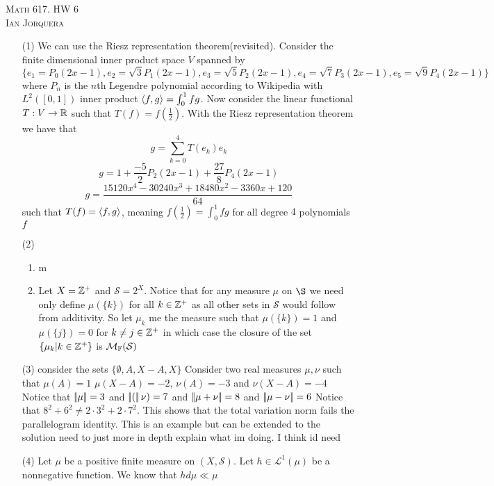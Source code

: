 \documentclass[12pt]{amsart}
\begin{document}
\begin{center}
   \textsc{Math 617. HW 6\\ Ian Jorquera}
\end{center}
\vspace{1em}

\begin{itemize}
    \item[(1)] We can use the Riesz representation theorem(revisited). 
    Consider the finite dimensional inner product space $V$ spanned by 
    \[\{e_1=P_0(2x-1),e_2=\sqrt{3}P_1(2x-1),e_3=\sqrt{5}P_2(2x-1),e_4=\sqrt{7}P_3(2x-1),e_5=\sqrt{9}P_4(2x-1)\}\] where $P_n$ is the $n$th 
    Legendre polynomial according to Wikipedia with $L^2([0,1])$ inner product $\left\langle f,g \right\rangle=\int_0^1fg$.
    Now consider the linear functional $T:V\rightarrow\mathbb{R}$ such that $T(f)=f(\frac{1}{2})$.
    With the Riesz representation theorem we have that 
    \[g=\sum_{k=0}^4T(e_k)e_k\]
    \[g=1+\frac{-5}{2}P_2(2x-1)+\frac{27}{8}P_4(2x-1)\]
    \[g=\frac{15120x^4-30240x^3+18480x^2-3360x+120}{64}\]
    such that $T(f)=\left\langle f,g \right\rangle$, meaning $f(\frac{1}{2})=\int_0^1fg$ for all degree $4$ polynomials $f$
    \item[(2)] 
    \begin{enumerate}[label=(\alph*)]
        \item m
        \item Let $X=\mathbb{Z}^+$ and $\mathcal{S}=2^X$. Notice that for any measure $\mu$
        on $\S$ we need only define $\mu(\{k\})$ for all $k\in \mathbb{Z}^+$ as 
        all other sets in $\mathcal S$ would follow from additivity.
        So let $\mu_k$ me the measure such that $\mu(\{k\})=1$ and 
        $\mu(\{j\})=0$ for $k\neq j\in\mathbb{Z}^+$ in which case the closure of the 
        set $\{\mu_k | k\in\mathbb{Z}^+\}$ is $\mathcal M_{\mathbb{F}}(\mathcal S)$

    \end{enumerate}
    \item[(3)] consider the sets $\{\emptyset, A, X-A, X\}$ Consider two real measures 
    $\mu,\nu$ such that $\mu(A)=1$ $\mu(X-A)=-2$, $\nu(A)=-3$ and $\nu(X-A)=-4$
    Notice that $\norm{\mu}=3$ and $\norm(\nu)=7$ and $\norm{\mu+\nu}=8$ and $\norm{\mu-\nu}=6$
    Notice that $8^2+6^2\neq 2\cdot 3^2+2\cdot 7^2$. This shows that the total variation norm fails the parallelogram identity.
    This is an example but can be extended to the solution need to just more in depth explain what im doing. I think id need 

    \item[(4)] Let $\mu$ be a positive finite measure on $(X,\mathcal S)$. 
    Let $h\in\mathcal L^1(\mu)$ be a nonnegative function. We know that $hd\mu\ll\mu$

\end{itemize}
\end{document}
